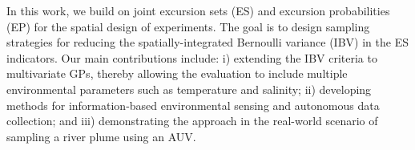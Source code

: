\documentclass[aoas]{imsart}
\begin{document}






In this work, we build on joint excursion sets (ES) and excursion
probabilities (EP) for the spatial design of experiments. The goal is
to design sampling strategies for reducing the spatially-integrated
Bernoulli variance (IBV) in the ES indicators. Our main contributions
include: i) extending the IBV criteria to multivariate
GPs, thereby allowing the evaluation to include multiple environmental
parameters such as temperature and salinity; ii) developing methods
for information-based environmental sensing and autonomous data
collection; and iii) demonstrating the approach in the real-world
scenario of sampling a river plume using an AUV.
\end{document}
